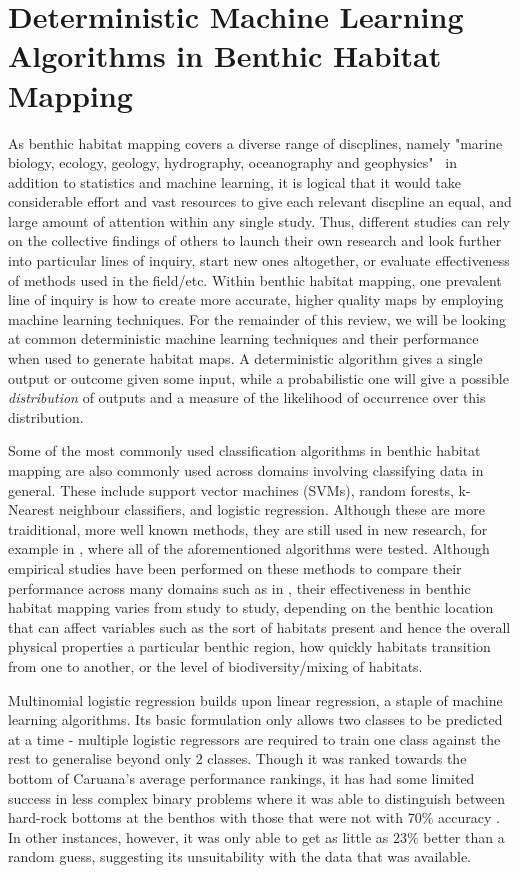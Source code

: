 \section{Deterministic Machine Learning Algorithms in Benthic Habitat Mapping}
As benthic habitat mapping covers a diverse range of discplines, namely "marine biology, ecology, geology, hydrography, oceanography and geophysics"~\citep{cjbrown11} in addition to statistics and machine learning, it is logical that it would take considerable effort and vast resources to give each relevant discpline an equal, and large amount of attention within any single study. Thus, different studies can rely on the collective findings of others to launch their own research and look further into particular lines of inquiry, start new ones altogether, or evaluate effectiveness of methods used in the field/etc. Within benthic habitat mapping, one prevalent line of inquiry is how to create more accurate, higher quality maps by employing machine learning techniques. For the remainder of this review, we will be looking at common deterministic machine learning techniques and their performance when used to generate habitat maps. A deterministic algorithm gives a single output or outcome given some input, while a probabilistic one will give a possible \textit{distribution} of outputs and a measure of the likelihood of occurrence over this distribution. 

Some of the most commonly used classification algorithms in benthic habitat mapping are also commonly used across domains involving classifying data in general. These include support vector machines (SVMs), random forests, k-Nearest neighbour classifiers, and logistic regression. Although these are more traiditional, more well known methods, they are still used in new research, for example in \citet{wahidin15}, where all of the aforementioned algorithms were tested. Although empirical studies have been performed on these methods to compare their performance across many domains such as in \citet{caruana06}, their effectiveness in benthic habitat mapping varies from study to study, depending on the benthic location that can affect variables such as the sort of habitats present and hence the overall physical properties a particular benthic region, how quickly habitats transition from one to another, or the level of biodiversity/mixing of habitats.

Multinomial logistic regression builds upon linear regression, a staple of machine learning algorithms. Its basic formulation only allows two classes to be predicted at a time - multiple logistic regressors are required to train one class against the rest to generalise beyond only $2$ classes. Though it was ranked towards the bottom of Caruana's average performance rankings, it has had some limited success in less complex binary problems where it was able to distinguish between hard-rock bottoms at the benthos with those that were not with 70\% accuracy \citep{dunn09}. In other instances, however, it was only able to get as little as $23\%$ better than a random guess\citep{belander}, suggesting its unsuitability with the data that was available.

